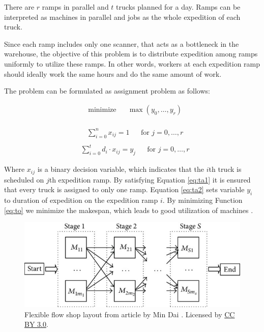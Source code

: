 \documentclass{ctuthesis}
\begin{document}
 There are $r$ ramps in parallel and $t$ trucks planned for a day. Ramps can be interpreted as machines in parallel and jobs as the whole expedition of each truck. 
 
 Since each ramp includes only one scanner, that acts as a bottleneck in the warehouse, the objective of this problem is to distribute expedition among ramps uniformly to utilize these ramps. In other words, workers at each expedition ramp should ideally work the same hours and do the same amount of work. 
 

  The problem can be formulated as assignment problem as follows:
 
 \begin{equation}\label{eq:to}
\begin{aligned}
&\text{minimize}
&&\max(y_0, \ldots, y_r)
\end{aligned}
\end{equation}
\\
\begin{equation} \label{eq:ta1}
\begin{aligned}
    & \sum_{i=0}^{n} x_{ij} = 1 && \text{for } j=0, \ldots, r\\
\end{aligned}
\end{equation}
\begin{equation} \label{eq:ta2}
\begin{aligned}
    & \sum_{i=0}^{t} {d_i} \cdot x_{ij} = y_j && \text{for } j=0, \ldots, r
\end{aligned}
\end{equation}
  
Where $x_{ij}$ is a binary decision variable, which indicates that the $i$th truck is scheduled on $j$th expedition ramp. By satisfying Equation \ref{eq:ta1} it is ensured that every truck is assigned to only one ramp. Equation \ref{eq:ta2} sets variable $y_i$ to duration of expedition on the expedition ramp $i$. By minimizing Function \ref{eq:to} we minimize the makespan, which leads to good utilization of machines \cite{pinedo}.

\begin{figure}[H]
\includegraphics[width=1\linewidth]{ffll.jpg}
\caption{Flexible flow shop layout from article by Min Dai \cite{ffllsource}. Licensed by \href{https://creativecommons.org/licenses/by/3.0/}{CC BY 3.0}.}
\label{fig:ffll}
\end{figure}
 
\end{document}
